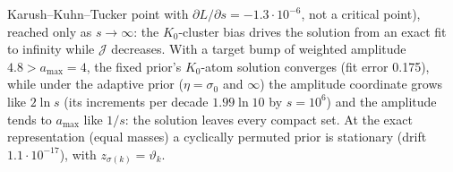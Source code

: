 Karush--Kuhn--Tucker point with $\partial L/\partial s = -1.3\cdot10^{-6}$, not a critical point), reached only as
$s\to\infty$: the $K_0$-cluster bias drives the solution from an exact fit to infinity while $\mathcal{J}$ decreases.
With a target bump of weighted amplitude $4.8 > a_{\max} = 4$, the fixed prior's $K_0$-atom solution converges (fit
error 0.175), while under the adaptive prior ($\eta = \sigma_0$ and $\infty$) the amplitude coordinate grows like
$2\ln s$ (its increments per decade $1.99\ln10$ by $s = 10^6$) and the amplitude tends to $a_{\max}$ like $1/s$: the
solution leaves every compact set. At the exact representation (equal masses) a cyclically permuted prior is
stationary (drift $1.1\cdot10^{-17}$), with $z_{\sigma(k)} = \vartheta_k$.

